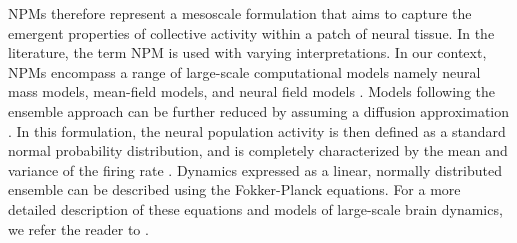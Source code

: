 \documentclass[12pt,twoside]{article}
\begin{document}
NPMs therefore represent a mesoscale formulation that aims to capture the emergent properties of collective activity within a patch of neural tissue. In the literature, the term NPM is used with varying interpretations. In our context, NPMs encompass a range of large-scale computational models namely neural mass models, mean-field models, and neural field models \citep{deco2008dynamic, bojak2014neural}. 
Models following the ensemble approach can be further reduced by assuming a diffusion approximation \citep{coombes2019next,deco2008dynamic}. In this formulation, the neural population activity is then defined as a standard normal probability distribution, and is completely characterized by the mean and variance of the firing rate \citep{breakspear2017dynamic}. Dynamics expressed as a linear, normally distributed ensemble can be described using the Fokker-Planck equations. For a more detailed description of these equations and models of large-scale brain dynamics, we refer the reader to \citet{breakspear2017dynamic}. 
\end{document}
